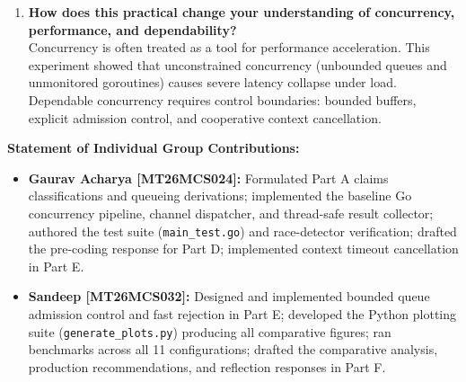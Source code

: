 \documentclass[11pt]{article}
\begin{document}
\begin{enumerate}[label=\textbf{Question \arabic*:}, leftmargin=1.5em, itemsep=0.45em]
    \item \textbf{How does this practical change your understanding of concurrency, performance, and dependability?}\\
    Concurrency is often treated as a tool for performance acceleration. This experiment showed that unconstrained concurrency (unbounded queues and unmonitored goroutines) causes severe latency collapse under load. Dependable concurrency requires control boundaries: bounded buffers, explicit admission control, and cooperative context cancellation.
\end{enumerate}

\vspace{0.8em}
\noindent\textbf{Statement of Individual Group Contributions:}
\begin{itemize}[itemsep=0.15em]
    \item \textbf{Gaurav Acharya [MT26MCS024]:} Formulated Part A claims classifications and queueing derivations; implemented the baseline Go concurrency pipeline, channel dispatcher, and thread-safe result collector; authored the test suite (\texttt{main\_test.go}) and race-detector verification; drafted the pre-coding response for Part D; implemented context timeout cancellation in Part E.
    \item \textbf{Sandeep [MT26MCS032]:} Designed and implemented bounded queue admission control and fast rejection in Part E; developed the Python plotting suite (\texttt{generate\_plots.py}) producing all comparative figures; ran benchmarks across all 11 configurations; drafted the comparative analysis, production recommendations, and reflection responses in Part F.
\end{itemize}
\end{document}
